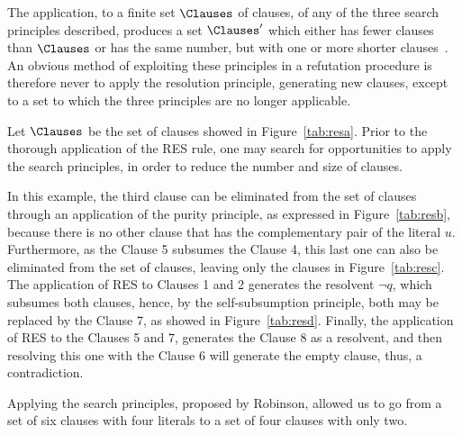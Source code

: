 The application, to a finite set $\Clauses$ of clauses, of any of the three
search principles described, produces a set $\Clauses'$ which either has fewer
clauses than $\Clauses$ or has the same number, but with one or more shorter
clauses~\cite{Robinson65}. An obvious method of exploiting these principles in a
refutation procedure is therefore never to apply the resolution principle,
generating new clauses, except to a set to which the three principles are no
longer applicable. 

\begin{example}
    Let $\Clauses$ be the set of clauses showed in Figure~\ref{tab:resa}. Prior
    to the thorough application of the RES rule, one may search for
    opportunities to apply the search principles, in order to reduce the
    number and size of clauses.

    In this example, the third clause can be eliminated from the set of clauses
    through an application of the purity principle, as expressed in
    Figure~\ref{tab:resb}, because there is no other clause that has the
    complementary pair of the literal $u$. 
    Furthermore, as the Clause 5 subsumes the Clause 4, this last one can also
    be eliminated from the set of clauses, leaving only the clauses in
    Figure~\ref{tab:resc}.
    The application of RES to Clauses 1 and 2 generates the resolvent
    $\neg q$, which subsumes both clauses, hence, by the self-subsumption principle,
    both may be replaced by the Clause 7, as showed in Figure~\ref{tab:resd}.
    Finally, the application of RES to the Clauses 5 and 7, generates the Clause
    8 as a resolvent, and then resolving this one with the Clause 6 will
    generate the empty clause, thus, a contradiction. 

    Applying the search principles, proposed by Robinson, allowed us to go from
    a set of six clauses with four literals to a set of four clauses with only
    two.


\end{example}
